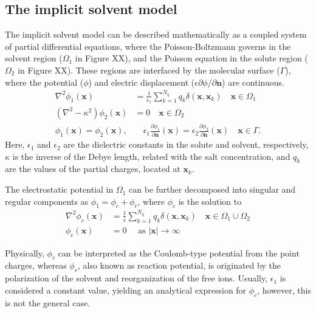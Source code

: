 \subsection*{\sffamily \large The implicit solvent model}

The implicit solvent model can be described mathematically as a coupled system of partial differential equations, where the Poisson-Boltzmann governs in the solvent region ($\Omega_1$ in Figure XX), and the Poisson equation in the solute region ($\Omega_2$ in Figure XX). These regions are interfaced by the molecular surface ($\Gamma$), where the potential ($\phi$) and electric displacement ($\epsilon\partial\phi/\partial\mathbf{n}$) are continuous. 
%
\begin{align}\label{eq:pbe}
\nabla^2\phi_1(\mathbf{x}) &= \tfrac{1}{\epsilon_1}\sum_{k=1}^{N_q} q_k\delta(\mathbf{x},\mathbf{x}_k) \quad  \mathbf{x} \in \Omega_1\nonumber\\
\left(\nabla^2 - \kappa^2\right)\phi_2(\mathbf{x})  &= 0 \quad\mathbf{x}\in\Omega_2\nonumber\\
\phi_1(\mathbf{x})  = \phi_2 (\mathbf{x}), &\quad \epsilon_1\frac{\partial\phi_1}{\partial\mathbf{n}}(\mathbf{x})  = \epsilon_2\frac{\partial\phi_2}{\partial\mathbf{n}}(\mathbf{x})  \quad \mathbf{x}\in \Gamma. 
\end{align}
%
Here, $\epsilon_1$ and $\epsilon_2$ are the dielectric constants in the solute and solvent, respectively, $\kappa$ is the inverse of the Debye length, related with the salt concentration, and $q_k$ are the values of the partial charges, located at $\mathbf{x}_k$.

The electrostatic potential in $\Omega_1$ can be further decomposed into singular and regular components as $\phi_1 = \phi_c + \phi_r$, where $\phi_c$ is the solution to
%
\begin{align}\label{eq:phic}
\nabla^2\phi_c(\mathbf{x}) &= \tfrac{1}{\epsilon}\sum_{k=1}^{N_q}q_k\delta(\mathbf{x},\mathbf{x}_k) \quad \mathbf{x}\in\Omega_1\cup\Omega_2\nonumber\\
\phi_c(\mathbf{x})&=0 \quad \text{ as } |\mathbf{x}|\to\infty
\end{align}

Physically, $\phi_c$ can be interpreted as the Coulomb-type potential from the point charges, whereas $\phi_r$, also known as reaction potential, is originated by the polarization of the solvent and reorganization of the free ions. 
Usually, $\epsilon_1$ is considered a constant value, yielding an analytical expression for $\phi_c$, however, this is not the general case.

